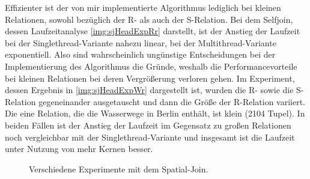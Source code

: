 \documentclass[a4paper,12pt,twoside]{article}
\begin{document}
Effizienter ist der von mir implementierte Algorithmus lediglich bei kleinen Relationen, sowohl bezüglich der R- als auch der S-Relation. Bei dem Selfjoin, dessen Laufzeitanalyse \autoref{img:sjHeadExpRr} darstellt, ist der Anstieg der Laufzeit bei der Singlethread-Variante nahezu linear, bei der Multithread-Variante exponentiell. Also sind wahrscheinlich ungünstige Entscheidungen bei der Implementierung des Algorithmus die Gründe, weshalb die Performancevorteile bei kleinen Relationen bei deren Vergrößerung verloren gehen. Im Experiment, dessen Ergebnis in \autoref{img:sjHeadExpWr} dargestellt ist, wurden die R- sowie die S-Relation gegeneinander ausgetauscht und dann die Größe der R-Relation variiert. Die eine Relation, die die Wasserwege in Berlin enthält, ist klein (2104 Tupel). In beiden Fällen ist der Anstieg der Laufzeit im Gegensatz zu großen Relationen noch vergleichbar mit der Singlethread-Variante und insgesamt ist die Laufzeit unter Nutzung von mehr Kernen besser. 

\begin{figure}
	\centering
	\caption{Verschiedene Experimente mit dem Spatial-Join.}
	\label{img:sjExpAllg}
\end{figure}
\end{document}
